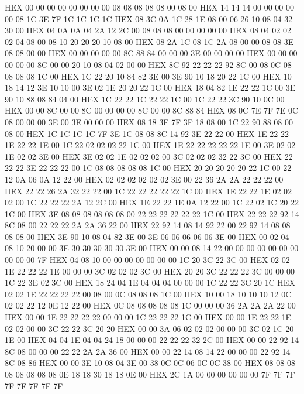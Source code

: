 \documentclass[10pt]{report}
\begin{document}
\nwenddocs{}\endmoddef\nwstartdeflinemarkup\nwenddeflinemarkup
    HEX     00 00 00 00 00 00 00 00 08 08 08 08 08 00 08 00
    HEX     14 14 14 00 00 00 00 00 08 1C 3E 7F 1C 1C 1C 1C
    HEX     08 3C 0A 1C 28 1E 08 00 06 26 10 08 04 32 30 00
    HEX     04 0A 0A 04 2A 12 2C 00 08 08 08 00 00 00 00 00
    HEX     08 04 02 02 02 04 08 00 08 10 20 20 20 10 08 00
    HEX     08 2A 1C 08 1C 2A 08 00 00 08 08 3E 08 08 00 00
    HEX     00 00 00 00 00 8C 88 84 00 00 00 3E 00 00 00 00
    HEX     00 00 00 00 00 00 8C 00 00 20 10 08 04 02 00 00
    HEX     8C 92 22 22 22 92 8C 00 08 0C 08 08 08 08 1C 00
    HEX     1C 22 20 10 84 82 3E 00 3E 90 10 18 20 22 1C 00
    HEX     10 18 14 12 3E 10 10 00 3E 02 1E 20 20 22 1C 00
    HEX     18 04 82 1E 22 22 1C 00 3E 90 10 88 08 84 04 00
    HEX     1C 22 22 1C 22 22 1C 00 1C 22 22 3C 90 10 0C 00
    HEX     00 00 8C 00 00 8C 00 00 00 00 8C 00 00 8C 88 84
    HEX     08 0C 7E 7F 7E 0C 08 00 00 00 3E 00 3E 00 00 00
    HEX     08 18 3F 7F 3F 18 08 00 1C 22 90 88 08 00 08 00
    HEX     1C 1C 1C 1C 7F 3E 1C 08 08 8C 14 92 3E 22 22 00
    HEX     1E 22 22 1E 22 22 1E 00 1C 22 02 02 02 22 1C 00
    HEX     1E 22 22 22 22 22 1E 00 3E 02 02 1E 02 02 3E 00
    HEX     3E 02 02 1E 02 02 02 00 3C 02 02 02 32 22 3C 00
    HEX     22 22 22 3E 22 22 22 00 1C 08 08 08 08 08 1C 00
    HEX     20 20 20 20 20 22 1C 00 22 12 0A 06 0A 12 22 00
    HEX     02 02 02 02 02 02 3E 00 22 36 2A 2A 22 22 22 00
    HEX     22 22 26 2A 32 22 22 00 1C 22 22 22 22 22 1C 00
    HEX     1E 22 22 1E 02 02 02 00 1C 22 22 22 2A 12 2C 00
    HEX     1E 22 22 1E 0A 12 22 00 1C 22 02 1C 20 22 1C 00
    HEX     3E 08 08 08 08 08 08 00 22 22 22 22 22 22 1C 00
    HEX     22 22 22 92 14 8C 08 00 22 22 22 2A 2A 36 22 00
    HEX     22 92 14 08 14 92 22 00 22 92 14 08 08 08 08 00
    HEX     3E 90 10 08 04 82 3E 00 3E 06 06 06 06 06 3E 00
    HEX     00 02 04 08 10 20 00 00 3E 30 30 30 30 30 3E 00
    HEX     00 00 08 14 22 00 00 00 00 00 00 00 00 00 00 7F
    HEX     04 08 10 00 00 00 00 00 00 00 1C 20 3C 22 3C 00
    HEX     02 02 1E 22 22 22 1E 00 00 00 3C 02 02 02 3C 00
    HEX     20 20 3C 22 22 22 3C 00 00 00 1C 22 3E 02 3C 00
    HEX     18 24 04 1E 04 04 04 00 00 00 1C 22 22 3C 20 1C
    HEX     02 02 1E 22 22 22 22 00 08 00 0C 08 08 08 1C 00
    HEX     10 00 18 10 10 10 12 0C 02 02 22 12 0E 12 22 00
    HEX     0C 08 08 08 08 08 1C 00 00 00 36 2A 2A 2A 22 00
    HEX     00 00 1E 22 22 22 22 00 00 00 1C 22 22 22 1C 00
    HEX     00 00 1E 22 22 1E 02 02 00 00 3C 22 22 3C 20 20
    HEX     00 00 3A 06 02 02 02 00 00 00 3C 02 1C 20 1E 00
    HEX     04 04 1E 04 04 24 18 00 00 00 22 22 22 32 2C 00
    HEX     00 00 22 92 14 8C 08 00 00 00 22 22 2A 2A 36 00
    HEX     00 00 22 14 08 14 22 00 00 00 22 92 14 8C 08 86
    HEX     00 00 3E 10 08 04 3E 00 38 0C 0C 06 0C 0C 38 00
    HEX     08 08 08 08 08 08 08 08 0E 18 18 30 18 18 0E 00
    HEX     2C 1A 00 00 00 00 00 00 7F 7F 7F 7F 7F 7F 7F 7F
\nwendcode{}\nwdocspar
\end{document}
